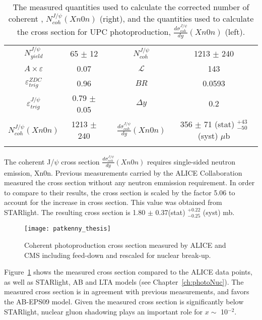     \begin{table}
      \centering
      \begin{tabular}{|c|c|c|c|c|} \hhline{--~--} 
        $N^{J/\psi}_{yield}$ & 65 $\pm$ 12 & & $N^{J/\psi}_{coh}$  & 1213 $\pm$ 240 \\ \hhline{--~--}  
        $A\times \varepsilon$ & 0.07 & & $\mathcal{L}$ & 143 \\ \hhline{--~--}
        $\varepsilon^{ZDC}_{trig}$ & 0.96 & & $BR$ & 0.0593 \\ \hhline{--~--}
        $\varepsilon^{J/\psi}_{trig}$ & 0.79 $\pm$ 0.05 & & $\Delta y$ & 0.2 \\ \hhline{--~--} \hhline{--~--}
        $N^{J/\psi{}}_{coh} (Xn0n)$ & 1213 $\pm$ 240 & & $\frac{d\sigma^{J/\psi}_{coh}}{dy} (Xn0n)$ & 356 $\pm$ 71 (stat) $^{+43}_{-50}$ (syst) $\mu$b \\  \hhline{--~--}
      \end{tabular}
      \caption{\label{tab:nJpCoh}The measured quantities used to calculate the 
        corrected number of coherent \JPsi{}, $N^{J/\psi}_{coh} (Xn0n)$ (right),
        and the quantities used to calculate the cross section for UPC \JPsi{} 
        photoproduction, $\frac{d\sigma^{J/\psi}_{coh}}{dy} (Xn0n)$ (left).}
    \end{table}  
    
    The coherent J/$\psi$ cross section 
      $\frac{d\sigma^{J/\psi}_{coh}}{dy} (Xn0n)$ requires single-sided neutron
      emission, Xn0n. 
    Previous measurements carried by the ALICE Collaboration measured the cross
      section without any neutron emmission requirement. 
    In order to compare to their results, the cross section is scaled by the 
      factor 5.06 to account for the increase in cross section. 
    This value was obtained from STARlight. 
    The resulting cross section is 1.80 $\pm$ 0.37(stat) $^{+0.22}_{-0.25}$ (syst) mb.
 
    \begin{figure}[!Hhbt]
      \centering
      \texttt{[image: patkenny\_thesis]}
      \caption{Coherent \JPsi{} photoproduction cross section measured by ALICE 
        and CMS including feed-down and rescaled for nuclear break-up.}
      \label{fig:coJpXsec}
    \end{figure}
    Figure~\ref{fig:coJpXsec} shows the measured cross section compared to the 
      ALICE data points, as well as STARlight, AB and LTA models 
      (see Chapter~\ref{ch:photoNuc}). 
    The measured cross section is in agreement with previous measurements, and 
      favors the AB-EPS09 model. 
    Given the measured cross section is significantly below STARlight, nuclear 
      gluon shadowing plays an important role for $x\sim$ 10$^{-2}$. 

